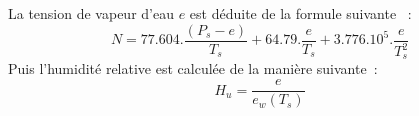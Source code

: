 La tension de vapeur d'eau $e$ est d\'eduite de la
formule suivante \cite{Delahaye-94}~:   
$$
N = 77.604.\frac{(P_s-e)}{T_s} + 64.79.\frac{e}{T_s} 
    + 3.776.10^5.\frac{e}{T_s^2}
$$
Puis l'humidit\'e relative est calcul\'ee de la
mani\`ere suivante~:
$$
H_u = \frac{e}{e_w(T_s)}
$$
